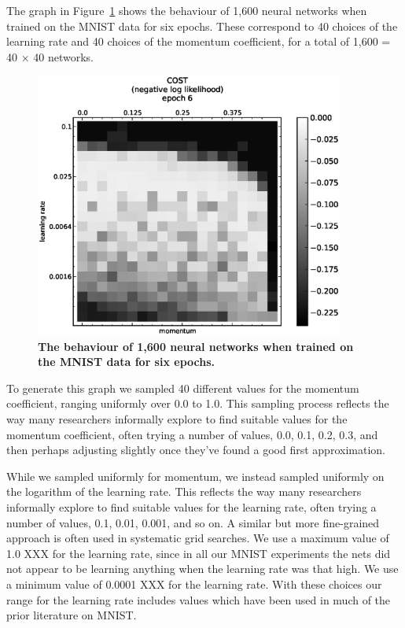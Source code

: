 \documentclass[10pt]{article}
\begin{document}
The graph in Figure~\ref{fig:mnist_basic} shows the behaviour of 1,600
neural networks when trained on the MNIST data for six epochs. These
correspond to 40 choices of the learning rate and 40 choices of the
momentum coefficient, for a total of 1,600 = 40 $\times$ 40 networks.

%
\begin{figure}[!ht]
\begin{center}
\includegraphics[width=4in]{plots/detailed/LF-20R10R-20T10-MNIST-6.eps}
\end{center}
\caption{ {\bf The behaviour of 1,600 neural networks when trained on
    the MNIST data for six epochs.}}
\label{fig:mnist_basic}
\end{figure}
%
%
%
%
%

To generate this graph we sampled 40 different values for the momentum
coefficient, ranging uniformly over 0.0 to 1.0.  This sampling process
reflects the way many researchers informally explore to find suitable
values for the momentum coefficient, often trying a number of values,
0.0, 0.1, 0.2, 0.3, and then perhaps adjusting slightly once they've
found a good first approximation.

While we sampled uniformly for momentum, we instead sampled uniformly
on the logarithm of the learning rate.  This reflects the way many
researchers informally explore to find suitable values for the
learning rate, often trying a number of values, 0.1, 0.01, 0.001, and
so on.  A similar but more fine-grained approach is often used in
systematic grid searches.  We use a maximum value of 1.0 XXX for the
learning rate, since in all our MNIST experiments the nets did not
appear to be learning anything when the learning rate was that high.
We use a minimum value of 0.0001 XXX for the learning rate.  With
these choices our range for the learning rate includes values which
have been used in much of the prior literature on MNIST.
\end{document}
